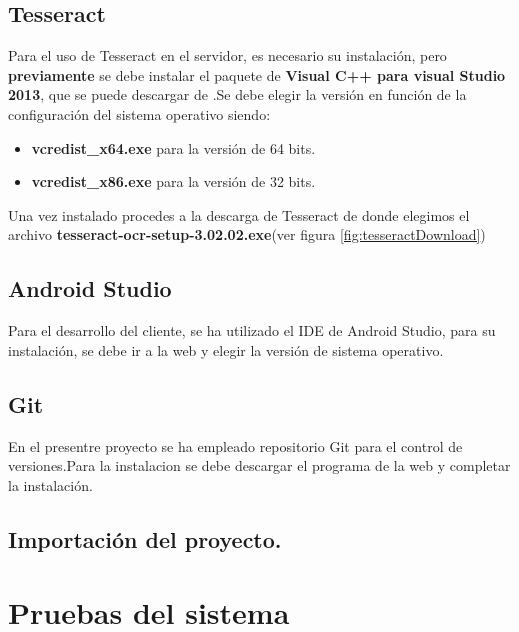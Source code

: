	\subsection{Tesseract}
	Para el uso de Tesseract en el servidor, es necesario su instalación, pero \textbf{previamente} se debe instalar el paquete de \textbf{Visual C++ para visual Studio 2013}, que se puede descargar de \cite{paqueteVisual}.Se debe elegir la versión en función de la configuración del sistema operativo siendo:
	\begin{itemize}
		\item \textbf{vcredist\_x64.exe} para la versión de 64 bits.
		\item \textbf{vcredist\_x86.exe} para la versión de 32 bits.
	\end{itemize}
Una vez instalado procedes a la descarga de Tesseract de \cite{tesseract} donde elegimos el archivo \textbf{tesseract-ocr-setup-3.02.02.exe}(ver figura \ref{fig:tesseractDownload})

	
	\subsection{Android Studio}
	Para el desarrollo del cliente, se ha utilizado el IDE de Android Studio, para su instalación, se debe ir a la web \cite{androidStudio} y elegir la versión de sistema operativo.
	
	\subsection{Git}
	En el presentre proyecto se ha empleado repositorio Git para el control de versiones.Para la instalacion se debe descargar el programa de la web \cite{git} y completar la instalación.

\subsection{Importación del proyecto.}

\section{Pruebas del sistema}
